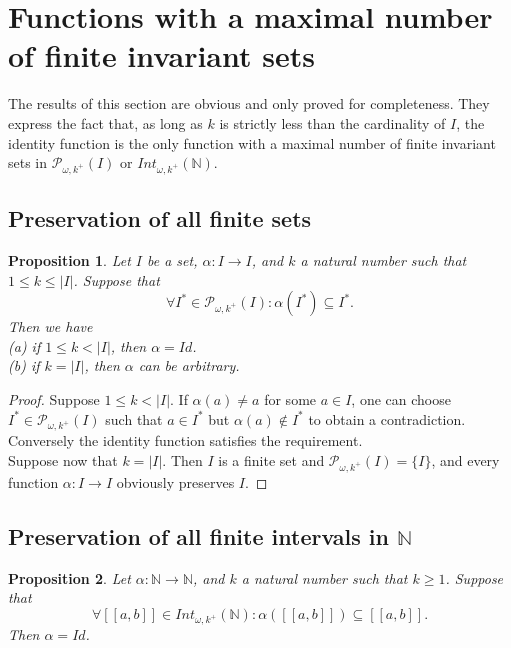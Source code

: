 \documentclass[a4paper,11pt]{article}
\theoremstyle{plain}
\newtheorem{proposition}{Proposition}[section]
\theoremstyle{definition}
\theoremstyle{remark}
\begin{document}
\section{Functions with a maximal number of finite invariant sets}
\label{sectionExactPreservUnderDirectImage}

The results of this section are obvious and only proved for completeness. They express the fact that, as long as $k$ is strictly less than the cardinality of $I$, the identity function is the only function with a maximal number of finite invariant sets in $\mathcal{P}_{\omega,k^+}(I)$ or $Int_{\omega, k^+}(\mathbb{N})$.

\subsection{Preservation of all finite sets}


\begin{proposition}
\label{propCharMapPreservingSets}
Let $I$ be a set, $\alpha : I \to I$, and $k$ a natural number such that $1 \leq k \leq |I|$. Suppose that
\[ \forall I^* \in \mathcal{P}_{\omega,k^+}(I) : \alpha(I^*) \subseteq I^*. \]
Then we have \\
(a) if $1 \leq k < |I|$, then $\alpha = Id$. \\
(b) if $k = |I|$, then $\alpha$ can be arbitrary.
\end{proposition}

\begin{proof}
Suppose $1 \leq k < |I|$. If $\alpha(a) \neq a$ for some $a \in I$, one can choose $I^* \in \mathcal{P}_{\omega,k^+}(I)$ such that $a \in I^*$ but $\alpha(a) \notin I^*$ to obtain a contradiction. Conversely the identity function satisfies the requirement. \\
Suppose now that $k = |I|$. Then $I$ is a finite set and $\mathcal{P}_{\omega, k^+}(I) = \{I\}$, and every function $\alpha : I \to I$ obviously preserves $I$.
\end{proof}


\subsection{Preservation of all finite intervals in $\mathbb{N}$}


\begin{proposition}
\label{propCharMapPreservingInt}
Let $\alpha : \mathbb{N} \to \mathbb{N}$, and $k$ a natural number such that $k \geq 1$. Suppose that
\[ \forall [\![a,b]\!] \in Int_{\omega, k^+}(\mathbb{N}) : \alpha([\![a,b]\!]) \subseteq [\![a,b]\!]. \]
Then $\alpha = Id$.
\end{proposition}
\end{document}
